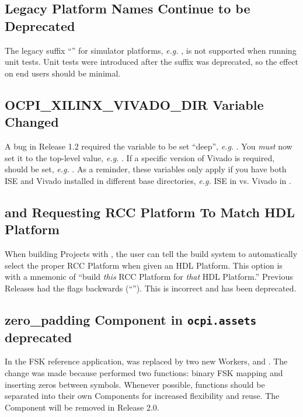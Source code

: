 \subsection{Legacy Platform Names Continue to be Deprecated} %
The legacy suffix ``'' for simulator platforms, \textit{e.g.} , is not supported when running unit tests. Unit tests were introduced after the suffix was deprecated, so the effect on end users should be minimal.

\subsection{OCPI\_XILINX\_VIVADO\_DIR Variable Changed} %
A bug in Release 1.2 required the variable to be set ``deep'', \textit{e.g.} . You \textit{must} now set it to the top-level value, \textit{e.g.} . If a specific version of Vivado is required,  should be set, \textit{e.g.} . As a reminder, these variables only apply if you have both ISE and Vivado installed in different base directories, \textit{e.g.} ISE in  vs. Vivado in .

\subsection{\ocpidev and Requesting RCC Platform To Match HDL Platform} %
When building Projects with \ocpidev, the user can tell the build system to automatically select the proper RCC Platform when given an HDL Platform. This option is  with a mnemonic of ``build \textit{this} RCC Platform for \textit{that} HDL Platform.'' Previous Releases had the flags backwards (``''). This is incorrect and has been deprecated.

\subsection{zero\_padding Component in \texttt{ocpi.assets} deprecated}
In the FSK reference application,  was replaced by two new Workers,  and . The change was made because  performed two functions: binary FSK mapping and inserting zeros between symbols. Whenever possible, functions should be separated into their own Components for increased flexibility and reuse. The  Component will be removed in Release 2.0.

